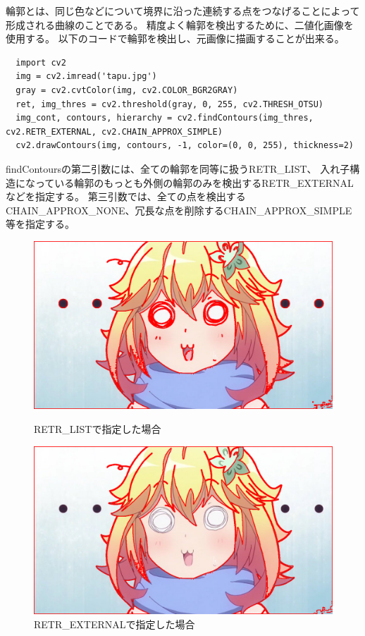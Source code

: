 \documentclass[dvipdfmx]{jsarticle}
\begin{document}
輪郭とは、同じ色などについて境界に沿った連続する点をつなげることによって
形成される曲線のことである。
精度よく輪郭を検出するために、二値化画像を使用する。
以下のコードで輪郭を検出し、元画像に描画することが出来る。
\begin{lstlisting}
  import cv2
  img = cv2.imread('tapu.jpg')
  gray = cv2.cvtColor(img, cv2.COLOR_BGR2GRAY)
  ret, img_thres = cv2.threshold(gray, 0, 255, cv2.THRESH_OTSU)
  img_cont, contours, hierarchy = cv2.findContours(img_thres, cv2.RETR_EXTERNAL, cv2.CHAIN_APPROX_SIMPLE)
  cv2.drawContours(img, contours, -1, color=(0, 0, 255), thickness=2)
\end{lstlisting}

findContoursの第二引数には、全ての輪郭を同等に扱うRETR\_LIST、
入れ子構造になっている輪郭のもっとも外側の輪郭のみを検出するRETR\_EXTERNALなどを指定する。
第三引数では、全ての点を検出するCHAIN\_APPROX\_NONE、冗長な点を削除するCHAIN\_APPROX\_SIMPLE等を指定する。

\begin{figure}[htbp]
  \begin{minipage}{0.5\hsize}
    \begin{center}
      \includegraphics[width=0.9\hsize]{../pic/contour1_list.png}
    \end{center}
    \caption{RETR\_LISTで指定した場合}
    \label{fig:contour_list}
  \end{minipage}
  \begin{minipage}{0.5\hsize}
    \begin{center}
      \includegraphics[width=0.9\hsize]{../pic/contour1_external.png}
    \end{center}
    \caption{RETR\_EXTERNALで指定した場合}
    \label{fig:contour_external}
  \end{minipage}
\end{figure}
\end{document}
